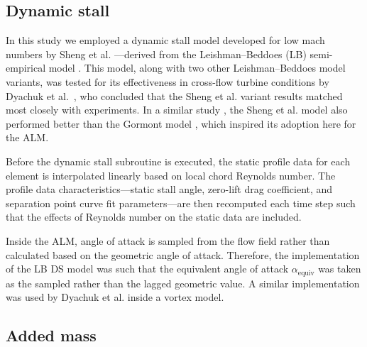 \documentclass[times]{weauth}
\begin{document}
\subsection{Dynamic stall}

In this study we employed a dynamic stall model developed for low mach numbers
by Sheng et al. \cite{Sheng2008}---derived from the Leishman--Beddoes (LB)
semi-empirical model \cite{Leishman1989}. This model, along with two other
Leishman--Beddoes model variants, was tested for its effectiveness in cross-flow
turbine conditions by Dyachuk et al.~\cite{Dyachuk2014}, who concluded that the
Sheng et al. variant results matched most closely with experiments. In a similar
study \cite{Dyachuk2015}, the Sheng et al. model also performed better than the
Gormont model \cite{Gormont1973}, which inspired its adoption here for the ALM.

Before the dynamic stall subroutine is executed, the static profile data for
each element is interpolated linearly based on local chord Reynolds number. The
profile data characteristics---static stall angle, zero-lift drag coefficient,
and separation point curve fit parameters---are then recomputed each time step
such that the effects of Reynolds number on the static data are included.

Inside the ALM, angle of attack is sampled from the flow field rather than
calculated based on the geometric angle of attack. Therefore, the implementation
of the LB DS model was such that the equivalent angle of attack
$\alpha_\mathrm{equiv}$ was taken as the sampled rather than the lagged
geometric value. A similar implementation was used by Dyachuk et al.
\cite{Dyachuk2015a} inside a vortex model.


\subsection{Added mass}
\end{document}

